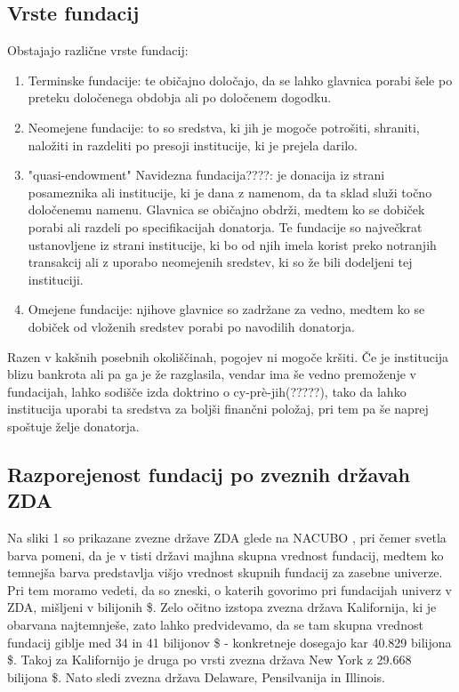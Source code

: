 \documentclass[12pt, a4paper]{article}
\begin{document}
\subsection{Vrste fundacij}
Obstajajo različne vrste fundacij:
\begin{enumerate}
\item Terminske fundacije: te običajno določajo, da se lahko glavnica porabi šele po preteku določenega obdobja ali po določenem dogodku.
\item Neomejene fundacije: to so sredstva, ki jih je mogoče potrošiti, shraniti, naložiti in razdeliti po presoji institucije, ki je prejela darilo.
\item "quasi-endowment" Navidezna fundacija????: je donacija iz strani posameznika ali institucije, ki je dana z namenom, da ta sklad služi točno določenemu namenu. Glavnica se običajno obdrži, medtem ko se dobiček porabi ali razdeli po specifikacijah donatorja. Te fundacije so največkrat ustanovljene iz strani institucije, ki bo od njih imela korist preko notranjih transakcij ali z uporabo neomejenih sredstev, ki so že bili dodeljeni tej instituciji.
\item Omejene fundacije: njihove glavnice so zadržane za vedno, medtem ko se dobiček od vloženih sredstev porabi po navodilih donatorja.
\end{enumerate}

Razen v kakšnih posebnih okoliščinah, pogojev ni mogoče kršiti. Če je institucija blizu bankrota ali pa ga je že razglasila, vendar ima še vedno premoženje v fundacijah, lahko sodišče izda doktrino o cy-prè-jih(?????), tako da lahko institucija uporabi ta sredstva za boljši finančni položaj, pri tem pa še naprej spoštuje želje donatorja.

\subsection{Razporejenost fundacij po zveznih državah ZDA}

Na sliki 1 so prikazane zvezne države ZDA glede na NACUBO \cite{wiki}, pri čemer svetla barva pomeni, da je v tisti državi majhna skupna vrednost fundacij, medtem ko temnejša barva predstavlja višjo vrednost skupnih fundacij za zasebne univerze. Pri tem moramo vedeti, da so zneski, o katerih govorimo pri fundacijah univerz v ZDA, mišljeni v bilijonih \$. Zelo očitno izstopa zvezna država Kalifornija, ki je obarvana najtemnješe, zato lahko predvidevamo, da se tam skupna vrednost fundacij giblje med 34 in 41 bilijonov \$ - konkretneje dosegajo kar 40.829
bilijona \$. Takoj za Kalifornijo je druga po vrsti zvezna država New York z 29.668 bilijona \$. Nato sledi zvezna država Delaware, Pensilvanija in Illinois. 
\end{document}
